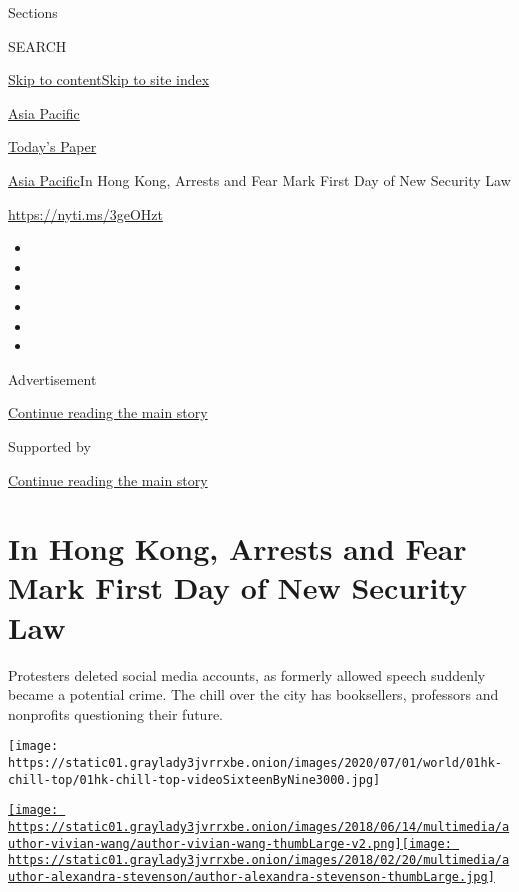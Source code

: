 Sections

SEARCH

\protect\hyperlink{site-content}{Skip to
content}\protect\hyperlink{site-index}{Skip to site index}

\href{https://www.nytimes3xbfgragh.onion/section/world/asia}{Asia
Pacific}

\href{https://myaccount.nytimes3xbfgragh.onion/auth/login?response_type=cookie\&client_id=vi}{}

\href{https://www.nytimes3xbfgragh.onion/section/todayspaper}{Today's
Paper}

\href{/section/world/asia}{Asia Pacific}\textbar{}In Hong Kong, Arrests
and Fear Mark First Day of New Security Law

\url{https://nyti.ms/3geOHzt}

\begin{itemize}
\item
\item
\item
\item
\item
\item
\end{itemize}

Advertisement

\protect\hyperlink{after-top}{Continue reading the main story}

Supported by

\protect\hyperlink{after-sponsor}{Continue reading the main story}

\hypertarget{in-hong-kong-arrests-and-fear-mark-first-day-of-new-security-law}{%
\section{In Hong Kong, Arrests and Fear Mark First Day of New Security
Law}\label{in-hong-kong-arrests-and-fear-mark-first-day-of-new-security-law}}

Protesters deleted social media accounts, as formerly allowed speech
suddenly became a potential crime. The chill over the city has
booksellers, professors and nonprofits questioning their future.

\texttt{[image: https://static01.graylady3jvrrxbe.onion/images/2020/07/01/world/01hk-chill-top/01hk-chill-top-videoSixteenByNine3000.jpg]}

\href{https://www.nytimes3xbfgragh.onion/by/vivian-wang}{\texttt{[image: https://static01.graylady3jvrrxbe.onion/images/2018/06/14/multimedia/author-vivian-wang/author-vivian-wang-thumbLarge-v2.png]}}\href{https://www.nytimes3xbfgragh.onion/by/alexandra-stevenson}{\texttt{[image: https://static01.graylady3jvrrxbe.onion/images/2018/02/20/multimedia/author-alexandra-stevenson/author-alexandra-stevenson-thumbLarge.jpg]}}


